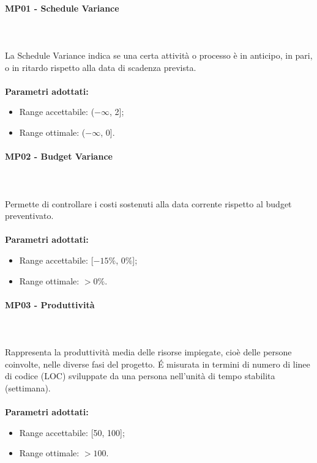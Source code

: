 \paragraph{MP01 - Schedule Variance} \mbox{} \\ \mbox{} \\
La Schedule Variance indica se una certa attività o processo è in anticipo, in pari, o in ritardo rispetto alla data di scadenza prevista. \\ \\ 
\textbf{Parametri adottati:} 
\begin{itemize}
\item Range accettabile: ($ -\infty $, 2];
\item Range ottimale: ($ -\infty $, 0].
\end{itemize}

\paragraph{MP02 - Budget Variance} \mbox{} \\ \mbox{} \\
Permette di controllare i costi sostenuti alla data corrente rispetto al budget preventivato. \\ \\ 
\textbf{Parametri adottati:}  
\begin{itemize}
\item Range accettabile: [$-15\%$, $0\%$]; 
\item Range ottimale: $ > 0\%$.
\end{itemize}

\paragraph{MP03 - Produttività} \mbox{} \\ \mbox{} \\
Rappresenta la produttività media delle risorse impiegate, cioè delle persone coinvolte, nelle diverse fasi del progetto. \'E misurata in termini di numero di linee di codice (LOC) sviluppate da una persona
nell’unità di tempo stabilita (settimana).\\ \\ 
\textbf{Parametri adottati:} 
\begin{itemize}
	\item Range accettabile: [50, 100];
	\item Range ottimale: $ > 100$.
\end{itemize}


